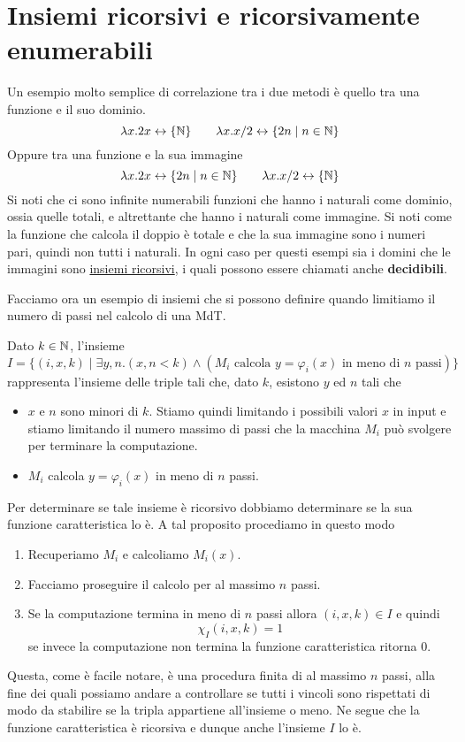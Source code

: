 \section{Insiemi ricorsivi e ricorsivamente enumerabili}
Un esempio molto semplice di correlazione tra i due metodi è
quello tra una funzione e il suo dominio.
\[
	\lambda x . 2 x \leftrightarrow \{ \mathbb{N} \} \qquad
	\lambda x . x / 2 \leftrightarrow \{ 2n \mid n \in \mathbb{N} \}
\]
Oppure tra una funzione e la sua immagine
\[
	\lambda x . 2 x \leftrightarrow \{ 2 n \mid n \in \mathbb{N} \}
	\qquad \lambda x . x / 2 \leftrightarrow \{ \mathbb{N} \}
\]
Si noti che ci sono infinite numerabili funzioni che hanno i
naturali come dominio, ossia quelle totali, e altrettante che
hanno i naturali come immagine. Si noti come la funzione che
calcola il doppio è totale e che la sua immagine sono i numeri
pari, quindi non tutti i naturali. In ogni caso per questi
esempi sia i domini che le immagini sono
\hyperref[def: relazione ricorsiva]{insiemi ricorsivi}, i quali
possono essere chiamati anche \textbf{decidibili}.

Facciamo ora un esempio di insiemi che si possono definire
quando limitiamo il numero di passi nel calcolo di una MdT.

\begin{example}
	Dato $k \in \mathbb{N}$, l'insieme
	\[
		I = \{ (i, x, k) \mid \exists y, n . (x, n < k)
		\land (M_i \text{ calcola } y = \varphi_i (x)
		\text{ in meno di } n \text{ passi}) \}
	\]
	rappresenta l'insieme delle triple tali che, dato $k$,
	esistono $y$ ed $n$ tali che
	\begin{itemize}
		\item $x$ e $n$ sono minori di $k$. Stiamo quindi
		      limitando i possibili valori $x$ in input e stiamo
		      limitando il numero massimo di passi che la
		      macchina $M_i$ può svolgere per terminare la
		      computazione.
		\item $M_i$ calcola $y = \varphi_i (x)$ in meno di $n$
		      passi.
	\end{itemize}
	Per determinare se tale insieme è ricorsivo dobbiamo
	determinare se la sua funzione caratteristica lo è. A tal
	proposito procediamo in questo modo
	\begin{enumerate}
		\item Recuperiamo $M_i$ e calcoliamo $M_i(x)$.
		\item Facciamo proseguire il calcolo per al massimo $n$
		      passi.
		\item Se la computazione termina in meno di $n$ passi
		      allora $(i, x, k) \in I$ e quindi
		      \[ \chi_I (i, x, k) = 1 \]
		      se invece la computazione non termina la funzione
		      caratteristica ritorna $0$.
	\end{enumerate}
	Questa, come è facile notare, è una procedura finita di al
	massimo $n$ passi, alla fine dei quali possiamo andare a
	controllare se tutti i vincoli sono rispettati di modo da
	stabilire se la tripla appartiene all'insieme o meno. Ne
	segue che la funzione caratteristica è ricorsiva e dunque
	anche l'insieme $I$ lo è.
\end{example}

